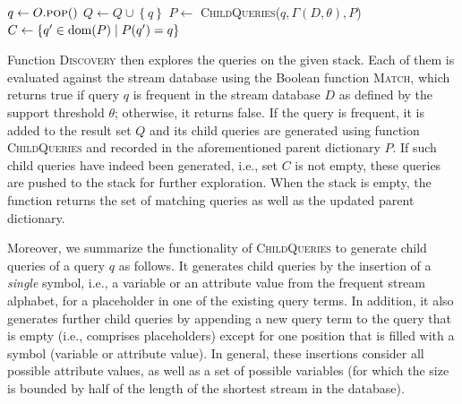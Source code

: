 \begin{algorithm}[t]
	\small
	\caption{\textsc{Discovery}}
	\label{alg-discovery}
	\BlankLine

	{
		${q \leftarrow O}.\textsc{pop}()$\;
		 {
			${Q \leftarrow Q \cup \left\{q\right\} }$\;
			${P \leftarrow}$
			\textsc{ChildQueries}($\mathit{q,\Gamma(D,\theta),P}$)\;
			${C} \leftarrow  \{q'\in \operatorname{dom}(P) \mid P(q')=q\}$\;
		}
	}
	{}
\end{algorithm}

Function \textsc{Discovery} then explores the queries on the given stack.
Each of them is evaluated against the stream database using the Boolean
function \textsc{Match}, which returns true if query $q$ is frequent in the
stream database $D$ as defined by the support threshold $\theta$; otherwise,
it returns false. If the query is frequent, it is added to the result set
$Q$ and its child queries are generated using function \textsc{ChildQueries}
and recorded in the aforementioned parent dictionary $P$. If such child
queries have indeed been generated, i.e., set $C$ is not empty, these
queries are pushed to the stack for further exploration.
When the stack is empty, the function returns the set of matching
queries as well as the updated parent dictionary.

Moreover, we summarize the functionality of \textsc{ChildQueries} to
generate child queries of a query $q$ as follows. It generates child queries
by the insertion of a \emph{single} symbol, i.e., a variable or an attribute
value from the frequent stream alphabet, for a placeholder in one of the
existing
query terms. In addition, it
also generates further child queries by appending a new query term to the
query that is empty (i.e., comprises placeholders) except for one position
that is filled with a symbol (variable or attribute value). In general,
these insertions consider all possible attribute values, as well as a set of
possible variables (for which the size is bounded by half of the length of
the shortest stream in the database).


